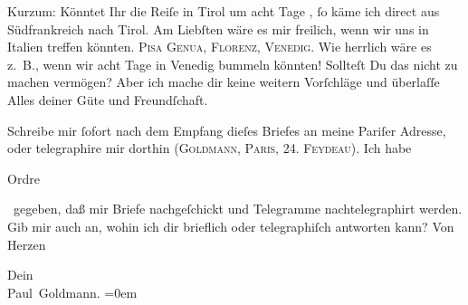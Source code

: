 \pstart
           Kurzum: Könntet Ihr die Reiſe in Tirol um
               acht Tage \label{K_L02610-3v}\label{K_L02610-3},{ }ſo käme ich direct aus Südfrankreich nach Tirol. Am
               Liebſten wäre es mir freilich, wenn wir uns in Italien treffen könnten. \textsc{Pisa}{ }\textsc{Genua}, \textsc{Florenz}, \textsc{Venedig}. Wie herrlich wäre es z. B., wenn wir acht Tage in Venedig bummeln könnten! Sollteſt Du das nicht zu {\pb}machen vermögen? Aber ich mache dir keine weitern Vorſchläge und überlaſſe Alles
               deiner Güte und Freundſchaft.\pend
           
\pstart
           Schreibe mir{ }ſofort nach dem Empfang dieſes Briefes an meine Pariſer Adresse, oder telegraphire mir dorthin (\textsc{Goldmann}, \textsc{Paris, 24. Feydeau}). Ich habe \begin{otherlanguage}{french}Ordre\end{otherlanguage} gegeben, daß mir Briefe
               nachgeſchickt und Telegramme nachtelegraphirt werden. Gib mir auch an, wohin ich dir
               brieflich oder telegraphiſch antworten kann? Von Herzen\pend
           
\pstart
           Dein{\\[\baselineskip]}\spacefill\mbox{Paul Goldmann.}\pend
           \leftskip=0em{}
\pstart
           \noindent{}{\pb}\label{T_L02610-1v}\label{T_L02610-1}\pend
           \endnumbering{}  \newcommand{\dateiname}{L02610}\newcommand{\titel}{Paul Goldmann an Arthur Schnitzler, 9. 8. [1894]}\newcommand{\editorInnen}{Martin Anton Müller und Laura Untner}

